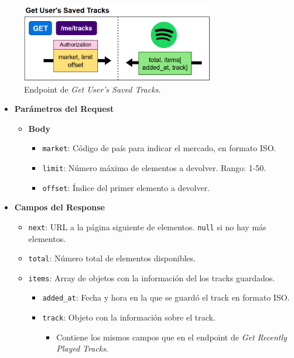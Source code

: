 \begin{figure}[H]
    \centering
    \includegraphics[width=0.75\textwidth]{figures/endpoints/get_users_saved_tracks.png}
    \caption{Endpoint de \textit{Get User's Saved Tracks}.}
    \label{fig:get_usr_saved_tracks}
\end{figure}

\begin{itemize}
    \item \textbf{Parámetros del Request}
          \begin{itemize}
              \item \textbf{Body}
                    \begin{itemize}
                        \item \texttt{market}: Código de país para indicar el mercado, en formato ISO.
                        \item \texttt{limit}: Número máximo de elementos a devolver. Rango: 1-50.
                        \item \texttt{offset}: Índice del primer elemento a devolver.
                    \end{itemize}
          \end{itemize}
    \item \textbf{Campos del Response}
          \begin{itemize}
              \item \texttt{next}: URL a la página siguiente de elementos. \texttt{null} si no hay más elementos.
              \item \texttt{total}: Número total de elementos disponibles.
              \item \texttt{items}: Array de objetos con la información del los tracks guardados.
                    \begin{itemize}
                        \item \texttt{added\_at}: Fecha y hora en la que se guardó el track en formato ISO.
                        \item \texttt{track}: Objeto con la información sobre el track.
                              \begin{itemize}
                                  \item Contiene los mismos campos que en el endpoint de \textit{Get Recently Played Tracks}.
                              \end{itemize}
                    \end{itemize}
          \end{itemize}
\end{itemize}

